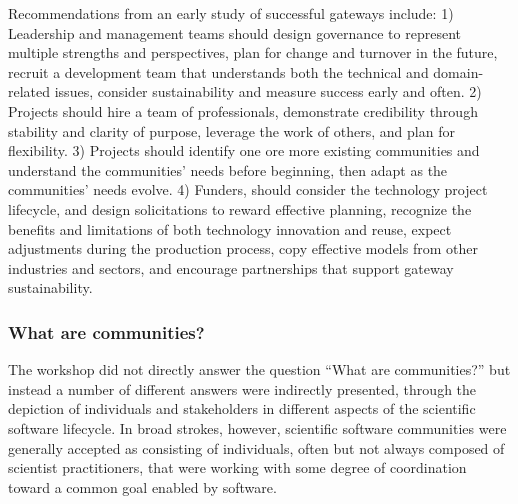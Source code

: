 \documentclass[11pt, oneside]{amsart}
\begin{document}
Recommendations from an early study of successful gateways include: 1)
Leadership and management teams should design governance to represent
multiple strengths and perspectives, plan for change and turnover in
the future, recruit a development team that understands both the
technical and domain-related issues, consider sustainability and
measure success early and often. 2) Projects should hire a team of
professionals, demonstrate credibility through stability and clarity
of purpose, leverage the work of others, and plan for flexibility. 3)
Projects should identify one ore more existing communities and understand the
communities' needs before beginning, then adapt as the communities'
needs evolve. 4) Funders, should consider the technology project
lifecycle, and design solicitations to reward effective planning,
recognize the benefits and limitations of both technology innovation
and reuse, expect adjustments during the production process, copy
effective models from other industries and sectors, and encourage
partnerships that support gateway sustainability.


\subsubsection{What are communities?}

The workshop did not directly answer the question ``What are
communities?'' but instead a number of different answers were
indirectly presented, through the depiction of individuals and
stakeholders in different aspects of the scientific software
lifecycle.  In broad strokes, however, scientific software communities
were generally accepted as consisting of individuals, often but not
always composed of scientist practitioners, that were working with
some degree of coordination toward a common goal enabled by software.
\end{document}
